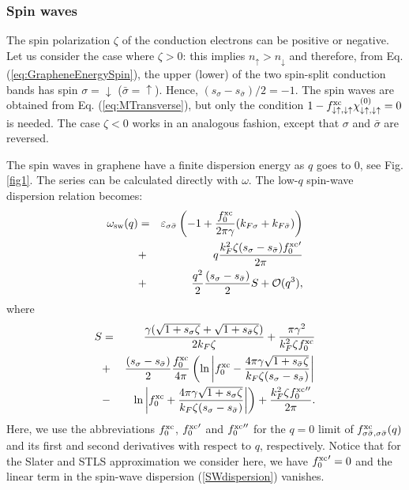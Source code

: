 \documentclass[aps,prb,twocolumn,superscriptaddress]{revtex4-2}
\newcommand{\si}{\sigma}
\newcommand{\sib}{{\bar{\sigma}}}
\newcommand{\bigO}{\mathcal{O}}
\newcommand{\kf}{k_F}
\newcommand{\w}{\omega}
\newcommand{\ua}{\uparrow}
\newcommand{\da}{\downarrow}
\newcommand{\ks}{k_{F\si}}
\newcommand{\ksb}{k_{F\sib}}
\newcommand{\essb}{\varepsilon_{\si\sib}}
\newcommand{\z}{\zeta}
\begin{document}
\subsubsection{Spin waves}

The spin polarization $\zeta$ of the conduction electrons can be positive or negative. Let us consider the case where $\zeta>0$:  this implies
$n_\ua>n_\da$ and therefore, from Eq. (\ref{eq:GrapheneEnergySpin}), the upper (lower) of the two spin-split conduction bands has
spin $\sigma = \da$ ($\bar \sigma = \ua$). Hence, $(s_\si - s_\sib)/2 = -1$. The spin waves are obtained from Eq. (\ref{eq:MTransverse}),
but only the condition $1 - f^{\rm xc}_{\da\ua,\da\ua} \chi^{(0)}_{\da\ua,\da\ua} = 0$ is needed. The case $\zeta<0$ works in an analogous fashion, except that
$\sigma$ and $\bar \sigma$ are reversed.

The spin waves in graphene have a finite dispersion energy as $q$ goes to 0, see Fig. \ref{fig1}.
The series can be calculated directly with $\w$. The low-$q$ spin-wave dispersion relation becomes:
\begin{eqnarray}\label{SWdispersion}
\omega_{\rm sw}(q) &=& \essb \left(-1+\frac{f^{\rm xc}_0}{2\pi\gamma}(\ks+\ksb)\right) \nonumber\\
&+&
q\frac{\kf^2\z(s_\si - s_\sib){f^{\rm xc}_0}'}{2\pi} \nonumber\\
&+& \frac{q^2}{2}\frac{(s_\si - s_\sib)}{2}  S + \bigO(q^3),
\end{eqnarray}
where
\begin{eqnarray}
S &=& \frac{\gamma(\sqrt{1+s_\si \z}+\sqrt{1+s_\sib \z})}{2\kf\z}
+ \frac{\pi\gamma^2}{\kf^2 \z f^{\rm xc}_0}
\nonumber\\
&+&
\frac{(s_\si - s_\sib)}{2}\frac{f^{\rm xc}_0}{4\pi}\left(
      \ln \left| f^{\rm xc}_0-\frac{4\pi\gamma\sqrt{1+s_\sib \z}}{\kf\z(s_\si - s_\sib)} \right| \right.\nonumber\\
&-&
\left.\ln \left| f^{\rm xc}_0+\frac{4\pi\gamma\sqrt{1+s_\si \z}}{\kf\z(s_\si - s_\sib)} \right|\right)
+ \frac{\kf^2\z {f^{\rm xc}_0}''}{2\pi} .
\end{eqnarray}
Here, we use the abbreviations $f^{\rm xc}_0$, ${f^{\rm xc}_0}'$ and ${f^{\rm xc}_0}''$
for the $q=0$ limit of $f^{\rm xc}_{\si \sib,\si \sib}(q)$ and its first and second derivatives with respect to $q$, respectively.
Notice that for the Slater and STLS approximation we consider here, we have ${f^{\rm xc}_0}'=0$ and the linear term
in the spin-wave dispersion (\ref{SWdispersion}) vanishes.
\end{document}
